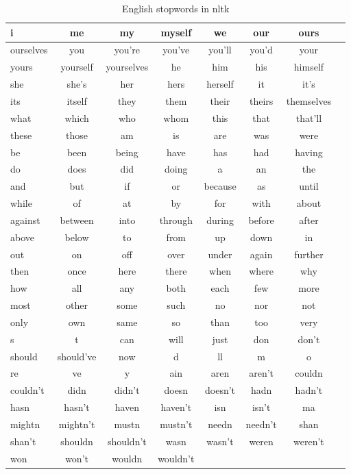 \begin{table}
\begin{center}
\caption{English stopwords in nltk}
\label{tbl:stop_words}
\begin{tabular}{@{}lccccccc@{}}
\toprule
i&me&my&myself&we&our&ours\\ \hline 
ourselves&you&you're&you've&you'll&you'd&your\\ \hline 
yours&yourself&yourselves&he&him&his&himself\\ \hline 
she&she's&her&hers&herself&it&it's\\ \hline 
its&itself&they&them&their&theirs&themselves\\ \hline 
what&which&who&whom&this&that&that'll\\ \hline 
these&those&am&is&are&was&were\\ \hline 
be&been&being&have&has&had&having\\ \hline 
do&does&did&doing&a&an&the\\ \hline 
and&but&if&or&because&as&until\\ \hline 
while&of&at&by&for&with&about\\ \hline 
against&between&into&through&during&before&after\\ \hline 
above&below&to&from&up&down&in\\ \hline 
out&on&off&over&under&again&further\\ \hline 
then&once&here&there&when&where&why\\ \hline 
how&all&any&both&each&few&more\\ \hline 
most&other&some&such&no&nor&not\\ \hline 
only&own&same&so&than&too&very\\ \hline 
s&t&can&will&just&don&don't\\ \hline 
should&should've&now&d&ll&m&o\\ \hline 
re&ve&y&ain&aren&aren't&couldn\\ \hline 
couldn't&didn&didn't&doesn&doesn't&hadn&hadn't\\ \hline 
hasn&hasn't&haven&haven't&isn&isn't&ma\\ \hline 
mightn&mightn't&mustn&mustn't&needn&needn't&shan\\ \hline 
shan't&shouldn&shouldn't&wasn&wasn't&weren&weren't\\ \hline 
won&won't&wouldn&wouldn't\\ \hline 
\bottomrule
\end{tabular}
\end{center}
\end{table}

